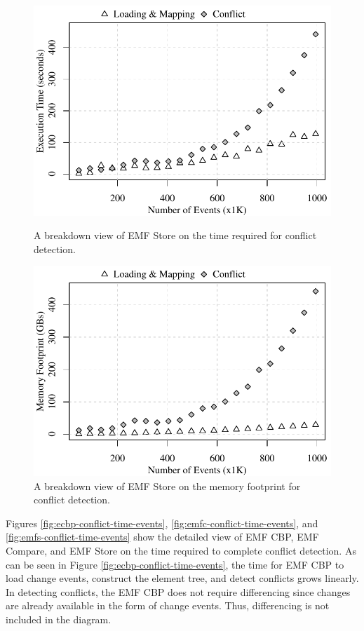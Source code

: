 \begin{figure}[]
\begin{minipage}[b]{0.490\textwidth}
	\includegraphics[width=\linewidth]{emfs-conflict-time-events}
	\caption{A breakdown view of EMF Store on the time required for conflict detection.}
	\label{fig:emfs-conflict-time-events}
\end{minipage}
\hfill
\begin{minipage}[b]{0.490\textwidth}
	\includegraphics[width=\linewidth]{emfs-conflict-memory-events}
	\caption{A breakdown view of EMF Store on the memory footprint for conflict detection.}
	\label{fig:emfs-conflict-memory-events}
\end{minipage}
\end{figure}

Figures \ref{fig:ecbp-conflict-time-events}, \ref{fig:emfc-conflict-time-events}, and \ref{fig:emfs-conflict-time-events} show the detailed view of EMF CBP, EMF Compare, and EMF Store on the time required to complete conflict detection. As can be seen in Figure \ref{fig:ecbp-conflict-time-events}, the time for EMF CBP to load change events, construct the element tree, and detect conflicts grows linearly. In detecting conflicts, the EMF CBP does not require differencing since changes are already available in the form of change events. Thus, differencing is not included in the diagram. 

